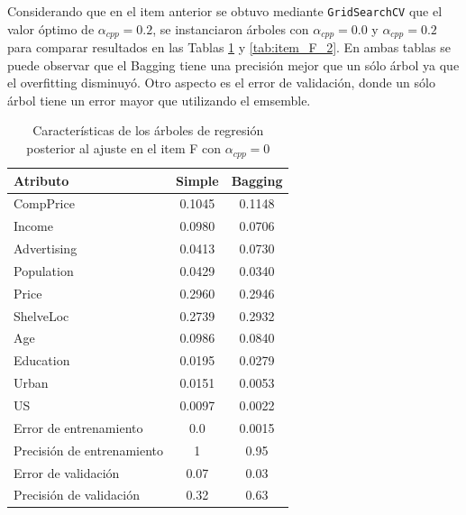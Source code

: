 Considerando que en el item anterior se obtuvo mediante \verb|GridSearchCV| que el valor óptimo de $\alpha_{cpp}=0.2$, se instanciaron árboles con $\alpha_{cpp}=0.0$ y $\alpha_{cpp}=0.2$ para comparar resultados en las Tablas \ref{tab:item_F_0} y \ref{tab:item_F_2}. En ambas tablas se puede observar que el Bagging tiene una precisión mejor que un sólo árbol ya que el overfitting disminuyó. Otro aspecto es el error de validación, donde un sólo árbol tiene un error mayor que utilizando el emsemble.

\begin{table}[H]
	\begin{small}
		\begin{center}
			\begin{tabular}[c]{l|c|c}
				Atributo	&Simple		&Bagging	\\\hline \hline
				CompPrice   &0.1045		& 0.1148	\\ \hline
				Income      &0.0980		& 0.0706	\\ \hline
				Advertising &0.0413		& 0.0730	\\ \hline
				Population  &0.0429		& 0.0340	\\ \hline
				Price       &0.2960		& 0.2946	\\ \hline
				ShelveLoc   &0.2739		& 0.2932	\\ \hline
				Age         &0.0986		& 0.0840	\\ \hline
				Education   &0.0195		& 0.0279	\\ \hline
				Urban       &0.0151		& 0.0053	\\ \hline
				US          &0.0097		& 0.0022	\\ \hline \hline
				Error de entrenamiento& 0.0&0.0015\\  \hline
				Precisión de entrenamiento & 1 & 0.95 \\ \hline
				Error de validación & 0.07 & 0.03 \\ \hline
				Precisión de validación &0.32 &0.63 \\\hline
			\end{tabular}
		\end{center}
	\end{small}
	\caption{Características de los árboles de regresión posterior al ajuste en el item F con $\alpha_{cpp}=0$}
	\label{tab:item_F_0}
\end{table}

